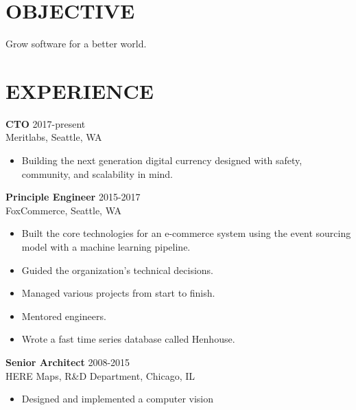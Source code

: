 \documentclass[line,margin]{res}
\begin{document}
\address{{\bf www.mempko.com}}
\address{{\bf max@mempko.com}}

\begin{resume}
 
\section{OBJECTIVE}       
                Grow software for a better world.
 
\section{EXPERIENCE} 
                {\bf CTO} \hfill 2017-present \\
                Meritlabs, 
                Seattle, WA
                 \begin{itemize}  \itemsep -1pt %
                    \item Building the next generation digital currency designed
                        with safety, community, and scalability in mind.
                 \end{itemize}
                {\bf Principle Engineer} \hfill 2015-2017 \\
                FoxCommerce, 
                Seattle, WA
                 \begin{itemize}  \itemsep -1pt %
                    \item Built the core technologies for an e-commerce system 
                        using the event sourcing model with a machine learning pipeline.
                    \item Guided the organization's technical decisions.
                    \item Managed various projects from start to finish.
                    \item Mentored engineers.
                    \item Wrote a fast time series database called Henhouse.
                 \end{itemize}
                {\bf Senior Architect} \hfill 2008-2015 \\
                HERE Maps, 
                R\&D Department, Chicago, IL
                 \begin{itemize}  \itemsep -1pt %
                    \item Designed and implemented a computer vision 

\end{itemize}
\end{resume}
\end{document}

